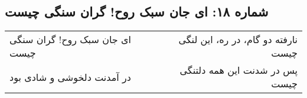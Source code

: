 \begin{center}
\section*{شماره ۱۸: ای جان سبک روح! گران سنگی چیست}
\label{sec:018}
\begin{longtable}{l p{0.5cm} r}
ای جان سبک روح! گران سنگی چیست
&&
نارفته دو گام، در ره، این لنگی چیست
\\
در آمدنت دلخوشی و شادی بود
&&
پس در شدنت این همه دلتنگی چیست
\\
\end{longtable}
\end{center}
